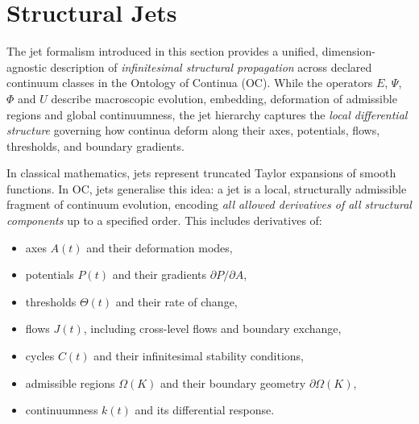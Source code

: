 
\section{Structural Jets}
\label{sec:jets-master}

The jet formalism introduced in this section provides a unified,
dimension-agnostic description of \emph{infinitesimal structural
propagation} across declared continuum classes in the Ontology of Continua (OC).
While the operators $E$, $\Psi$, $\Phi$ and $U$ describe macroscopic
evolution, embedding, deformation of admissible regions and global
continuumness, the jet hierarchy captures the \emph{local differential
structure} governing how continua deform along their axes, potentials,
flows, thresholds, and boundary gradients.

\medskip

In classical mathematics, jets represent truncated Taylor expansions of
smooth functions. In OC, jets generalise this idea: a jet is a local,
structurally admissible fragment of continuum evolution, encoding
\emph{all allowed derivatives of all structural components} up to a
specified order. This includes derivatives of:

\begin{itemize}
    \item axes $A(t)$ and their deformation modes,
    \item potentials $P(t)$ and their gradients $\partial P / \partial A$,
    \item thresholds $\Theta(t)$ and their rate of change,
    \item flows $J(t)$, including cross-level flows and boundary exchange,
    \item cycles $C(t)$ and their infinitesimal stability conditions,
    \item admissible regions $\Omega(K)$ and their boundary geometry $\partial\Omega(K)$,
    \item continuumness $k(t)$ and its differential response.
\end{itemize}

